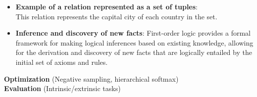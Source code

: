\documentclass[
]{article}
\providecommand{\tightlist}{%
  \setlength{\itemsep}{0pt}\setlength{\parskip}{0pt}}
\begin{document}
\begin{itemize}
\begin{itemize}
    \begin{itemize}
    \tightlist
    \item
      \textbf{Constants}: Symbols that represent specific objects (e.g.,
      Italy, Rome).
    \item
      \textbf{Variables}: Symbols that can represent any object in the
      domain of discourse (e.g., {}, {}).
    \item
      \textbf{Relations (Predicates)}: Symbols that express
      relationships between objects or properties of objects (e.g.,
      Capital({}, {}), is\_a({}, country)).
    \end{itemize}
  \item
    \textbf{Example of a relation represented as a set of tuples}:\\
    {} This relation represents the capital city of each country in the
    set.
  \item
    \textbf{Inference and discovery of new facts}: First-order logic
    provides a formal framework for making logical inferences based on
    existing knowledge, allowing for the derivation and discovery of new
    facts that are logically entailed by the initial set of axioms and
    rules.
  \end{itemize}
\end{itemize}

\textbf{Optimization} (Negative sampling, hierarchical softmax)\\
\textbf{Evaluation} (Intrinsic/extrinsic tasks)
\end{document}

